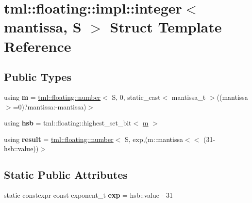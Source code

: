 \hypertarget{structtml_1_1floating_1_1impl_1_1integer}{\section{tml\+:\+:floating\+:\+:impl\+:\+:integer$<$ mantissa, S $>$ Struct Template Reference}
\label{structtml_1_1floating_1_1impl_1_1integer}
}
\subsection*{Public Types}
\begin{DoxyCompactItemize}
\item 
\hypertarget{structtml_1_1floating_1_1impl_1_1integer_a5ef5bc40d04f5702300c052fce5bd237}{using {\bfseries m} = \hyperlink{structtml_1_1floating_1_1number}{tml\+::floating\+::number}$<$ S, 0, static\+\_\+cast$<$ mantissa\+\_\+t $>$((mantissa $>$=0)?mantissa\+:-\/mantissa)$>$}\label{structtml_1_1floating_1_1impl_1_1integer_a5ef5bc40d04f5702300c052fce5bd237}

\item 
\hypertarget{structtml_1_1floating_1_1impl_1_1integer_aa1dabc3307b327d21176e79806debdc9}{using {\bfseries hsb} = tml\+::floating\+::highest\+\_\+set\+\_\+bit$<$ \hyperlink{structtml_1_1floating_1_1number}{m} $>$}\label{structtml_1_1floating_1_1impl_1_1integer_aa1dabc3307b327d21176e79806debdc9}

\item 
\hypertarget{structtml_1_1floating_1_1impl_1_1integer_a398c861b974aa3535e4b0e66c67b278d}{using {\bfseries result} = \hyperlink{structtml_1_1floating_1_1number}{tml\+::floating\+::number}$<$ S, exp,(m\+::mantissa$<$$<$ (31-\/hsb\+::value))$>$}\label{structtml_1_1floating_1_1impl_1_1integer_a398c861b974aa3535e4b0e66c67b278d}

\end{DoxyCompactItemize}
\subsection*{Static Public Attributes}
\begin{DoxyCompactItemize}
\item 
\hypertarget{structtml_1_1floating_1_1impl_1_1integer_a7bf180e8297682ae8ff966078d2ea84d}{static constexpr const exponent\+\_\+t {\bfseries exp} = hsb\+::value -\/ 31}\label{structtml_1_1floating_1_1impl_1_1integer_a7bf180e8297682ae8ff966078d2ea84d}

\end{DoxyCompactItemize}


